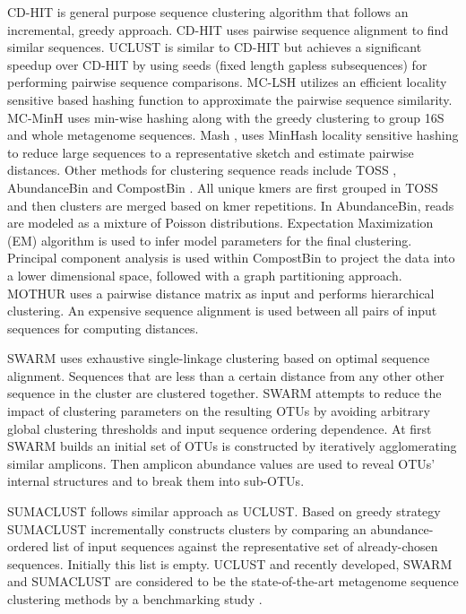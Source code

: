 \documentclass[10pt, conference, compsocconf]{IEEEtran}
\begin{document}
CD-HIT \cite{MARCDhit} is general purpose sequence clustering algorithm that follows an incremental, greedy approach. CD-HIT uses pairwise sequence alignment to find similar sequences. UCLUST \cite{MARuclust} is similar to CD-HIT but achieves a significant speedup over CD-HIT by using seeds (fixed length gapless subsequences) for performing pairwise sequence comparisons. MC-LSH \cite{MARMetaLSH} utilizes an efficient locality sensitive based hashing function to approximate the pairwise sequence similarity. MC-MinH \cite{MARMcMinH} uses min-wise \cite{MARMinWise} hashing along with the greedy clustering to group 16S and whole metagenome sequences. Mash \cite{MAROtherMinH}, uses MinHash locality sensitive hashing to reduce large sequences to a representative sketch and estimate pairwise distances. Other methods for clustering sequence reads include TOSS \cite{MARToss}, AbundanceBin \cite{MARAbundant} and CompostBin \cite{MARCompost}. All unique kmers are first grouped in TOSS and then clusters are merged based on kmer repetitions. In AbundanceBin, reads are modeled as a mixture of Poisson distributions. Expectation Maximization (EM) algorithm is used to infer model parameters for the final clustering. Principal component analysis is used within CompostBin to project the data into a lower dimensional space, followed with a graph partitioning approach. MOTHUR \cite{MARMothur} uses a pairwise distance matrix as input and performs hierarchical clustering. An expensive sequence alignment is used between all pairs of input sequences for computing distances.

SWARM \cite{MARSwarm2} uses exhaustive single-linkage clustering based on optimal sequence alignment. Sequences that are less than a certain distance from any other other sequence in the cluster are clustered together. SWARM attempts to reduce the impact of clustering parameters on the resulting OTUs by avoiding arbitrary global clustering thresholds and input sequence ordering dependence. At first SWARM builds an initial set of OTUs is constructed by iteratively agglomerating similar amplicons. Then amplicon abundance values are used to reveal OTUs’ internal structures and to break them into sub-OTUs.

SUMACLUST \cite{MARSumaclust} follows similar approach as UCLUST. Based on greedy strategy SUMACLUST incrementally constructs clusters by comparing an abundance-ordered list of input sequences against the representative set of already-chosen sequences. Initially this list is empty. UCLUST and recently developed, SWARM and SUMACLUST are considered to be the state-of-the-art metagenome sequence clustering methods by a benchmarking study \cite{MARopenDeNovo}. 
\end{document}

